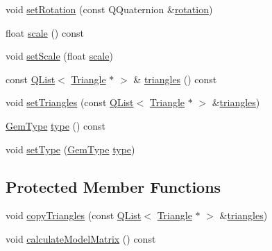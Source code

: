 \begin{DoxyCompactItemize}
\item 
void \hyperlink{class_gem_data_ac22fb4a6faf13d78299be0f5cfd029a1}{set\+Rotation} (const Q\+Quaternion \&\hyperlink{class_gem_data_a3c902384912903b22d5eaab7e70f1f5c}{rotation})
\item 
float \hyperlink{class_gem_data_a39ef099801a421c7b7ffbbd920084eb0}{scale} () const 
\item 
void \hyperlink{class_gem_data_a49e18ed27815f66469f4ac951b5f969b}{set\+Scale} (float \hyperlink{class_gem_data_a39ef099801a421c7b7ffbbd920084eb0}{scale})
\item 
const \hyperlink{singleton_q_list}{Q\+List}$<$ \hyperlink{class_triangle}{Triangle} $\ast$ $>$ \& \hyperlink{class_gem_data_a2c8956630fdf362efe4e69db9bad2f7f}{triangles} () const 
\item 
void \hyperlink{class_gem_data_aa4be4b2b96ae412308c89e053249d744}{set\+Triangles} (const \hyperlink{singleton_q_list}{Q\+List}$<$ \hyperlink{class_triangle}{Triangle} $\ast$ $>$ \&\hyperlink{class_gem_data_a2c8956630fdf362efe4e69db9bad2f7f}{triangles})
\item 
\hyperlink{abstractgem_8h_a2f0a34b6dac35a9610cab7a1c5fcb444}{Gem\+Type} \hyperlink{class_gem_data_a38e33b0c64c37f30d0e063580d6a20bb}{type} () const 
\item 
void \hyperlink{class_gem_data_a10d94a0bd72a57fb9a52a8f534f3e1dd}{set\+Type} (\hyperlink{abstractgem_8h_a2f0a34b6dac35a9610cab7a1c5fcb444}{Gem\+Type} \hyperlink{class_gem_data_a38e33b0c64c37f30d0e063580d6a20bb}{type})
\end{DoxyCompactItemize}
\subsection*{Protected Member Functions}
\begin{DoxyCompactItemize}
\item 
void \hyperlink{class_gem_data_a24986c8eaaa23640a7cb7fff9f4df2b5}{copy\+Triangles} (const \hyperlink{singleton_q_list}{Q\+List}$<$ \hyperlink{class_triangle}{Triangle} $\ast$ $>$ \&\hyperlink{class_gem_data_a2c8956630fdf362efe4e69db9bad2f7f}{triangles})
\item 
void \hyperlink{class_gem_data_ac558e3bbb71c2ec73400f0a0cb309693}{calculate\+Model\+Matrix} () const 
\end{DoxyCompactItemize}
